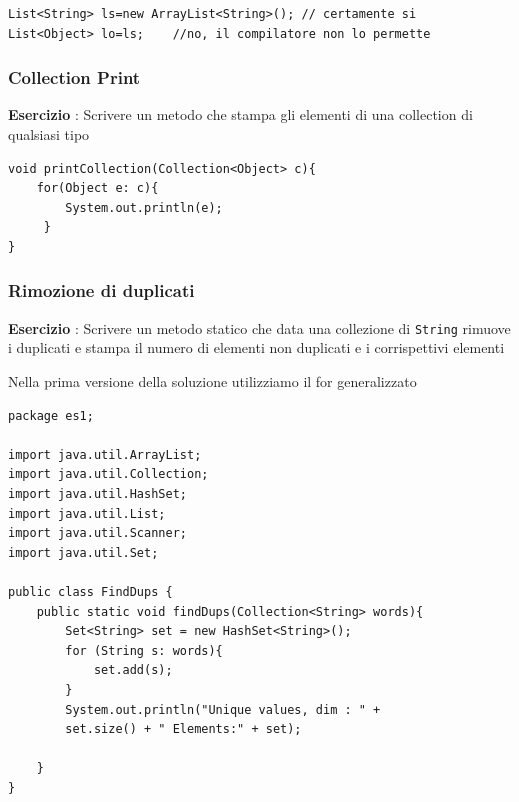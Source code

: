\documentclass{article}
\begin{document}
\begin{lstlisting}
List<String> ls=new ArrayList<String>(); // certamente si
List<Object> lo=ls;    //no, il compilatore non lo permette
\end{lstlisting}

\subsubsection{Collection Print}
\begin{framed}
\textbf{Esercizio }: Scrivere un metodo che stampa gli elementi di una collection di qualsiasi tipo
\end{framed}

\begin{lstlisting}
void printCollection(Collection<Object> c){
    for(Object e: c){
        System.out.println(e);     
     }   
}
\end{lstlisting}


\subsubsection{Rimozione di duplicati}
\begin{framed}
\textbf{Esercizio }: Scrivere un metodo statico che data una collezione di \texttt{String} rimuove i duplicati e stampa il numero di elementi non duplicati e i corrispettivi elementi
\end{framed}

Nella prima versione della soluzione utilizziamo il for generalizzato
\begin{lstlisting}
package es1;

import java.util.ArrayList;
import java.util.Collection;
import java.util.HashSet;
import java.util.List;
import java.util.Scanner;
import java.util.Set;

public class FindDups {
	public static void findDups(Collection<String> words){
		Set<String> set = new HashSet<String>();
		for (String s: words){
			set.add(s);
		}
		System.out.println("Unique values, dim : " + 
		set.size() + " Elements:" + set);
			
	}
}
\end{lstlisting}
\end{document}

